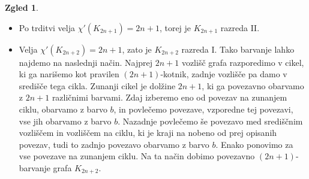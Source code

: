 \documentclass[11pt]{book}
\theoremstyle{definition}
\theoremstyle{zgled}
\newtheorem*{zgled}{Zgled}
\theoremstyle{odprtproblem}
\theoremstyle{domacanaloga}
\theoremstyle{izrek}
\begin{document}
\begin{zgled} \leavevmode
\begin{itemize}
\item Po trditvi velja $\chi'(K_{2n+1}) = 2n+1$, torej je $K_{2n+1}$ razreda II.
\item Velja $\chi'(K_{2n + 2}) = 2n+1$, zato je $K_{2n+2}$ razreda I. Tako barvanje lahko najdemo na naslednji način. Najprej $2n+1$ vozlišč grafa razporedimo v cikel, ki ga narišemo kot pravilen $(2n+1)$-kotnik, zadnje vozlišče pa damo v središče tega cikla. Zunanji cikel je dolžine $2n+1$, ki ga povezavno obarvamo z $2n+1$ različnimi barvami. Zdaj izberemo eno od povezav na zunanjem ciklu, obarvamo z barvo $b$, in povlečemo povezave, vzporedne tej povezavi, vse jih obarvamo z barvo $b$. Nazadnje povlečemo še povezavo med središčnim vozliščem in vozliščem na ciklu, ki je kraji na nobeno od prej opisanih povezav, tudi to zadnjo povezavo obarvamo z barvo $b$. Enako ponovimo za vse povezave na zunanjem ciklu. Na ta način dobimo povezavno $(2n+1)$-barvanje grafa $K_{2n+2}$.
\end{itemize}
\end{zgled}
\end{document}
